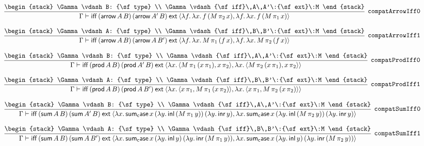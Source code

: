 \[
\infer[{\tt compatArrowIff0}]{\Gamma \vdash {\sf iff}\,({\sf arrow}\,A\,B)\,({\sf arrow}\,A'\,B)\:{\sf ext}\:\langle \lambda f.\,\lambda x.\,f\,(M\, \pi_2\,x),\lambda f.\,\lambda x.\,f\,(M\, \pi_1\,x)\rangle }{
\begin{stack}
\Gamma \vdash B: {\sf type}
\\
\Gamma \vdash {\sf iff}\,A\,A'\:{\sf ext}\:M
\end{stack}}
\]

\[
\infer[{\tt compatArrowIff1}]{\Gamma \vdash {\sf iff}\,({\sf arrow}\,A\,B)\,({\sf arrow}\,A\,B')\:{\sf ext}\:\langle \lambda f.\,\lambda x.\,M\, \pi_1\,(f\,x),\lambda f.\,\lambda x.\,M\, \pi_2\,(f\,x)\rangle }{
\begin{stack}
\Gamma \vdash A: {\sf type}
\\
\Gamma \vdash {\sf iff}\,B\,B'\:{\sf ext}\:M
\end{stack}}
\]

\[
\infer[{\tt compatProdIff0}]{\Gamma \vdash {\sf iff}\,({\sf prod}\,A\,B)\,({\sf prod}\,A'\,B)\:{\sf ext}\:\langle \lambda x.\,\langle M\, \pi_1\,(x\, \pi_1),x\, \pi_2\rangle ,\lambda x.\,\langle M\, \pi_2\,(x\, \pi_1),x\, \pi_2\rangle \rangle }{
\begin{stack}
\Gamma \vdash B: {\sf type}
\\
\Gamma \vdash {\sf iff}\,A\,A'\:{\sf ext}\:M
\end{stack}}
\]

\[
\infer[{\tt compatProdIff1}]{\Gamma \vdash {\sf iff}\,({\sf prod}\,A\,B)\,({\sf prod}\,A\,B')\:{\sf ext}\:\langle \lambda x.\,\langle x\, \pi_1,M\, \pi_1\,(x\, \pi_2)\rangle ,\lambda x.\,\langle x\, \pi_1,M\, \pi_2\,(x\, \pi_2)\rangle \rangle }{
\begin{stack}
\Gamma \vdash A: {\sf type}
\\
\Gamma \vdash {\sf iff}\,B\,B'\:{\sf ext}\:M
\end{stack}}
\]

\[
\infer[{\tt compatSumIff0}]{\Gamma \vdash {\sf iff}\,({\sf sum}\,A\,B)\,({\sf sum}\,A'\,B)\:{\sf ext}\:\langle \lambda x.\,{\sf sum_case}\,x\,(\lambda y.\,{\sf inl}\,(M\, \pi_1\,y))\,(\lambda y.\,{\sf inr}\,y),\lambda x.\,{\sf sum_case}\,x\,(\lambda y.\,{\sf inl}\,(M\, \pi_2\,y))\,(\lambda y.\,{\sf inr}\,y)\rangle }{
\begin{stack}
\Gamma \vdash B: {\sf type}
\\
\Gamma \vdash {\sf iff}\,A\,A'\:{\sf ext}\:M
\end{stack}}
\]

\[
\infer[{\tt compatSumIff1}]{\Gamma \vdash {\sf iff}\,({\sf sum}\,A\,B)\,({\sf sum}\,A\,B')\:{\sf ext}\:\langle \lambda x.\,{\sf sum_case}\,x\,(\lambda y.\,{\sf inl}\,y)\,(\lambda y.\,{\sf inr}\,(M\, \pi_1\,y)),\lambda x.\,{\sf sum_case}\,x\,(\lambda y.\,{\sf inl}\,y)\,(\lambda y.\,{\sf inr}\,(M\, \pi_2\,y))\rangle }{
\begin{stack}
\Gamma \vdash A: {\sf type}
\\
\Gamma \vdash {\sf iff}\,B\,B'\:{\sf ext}\:M
\end{stack}}
\]

